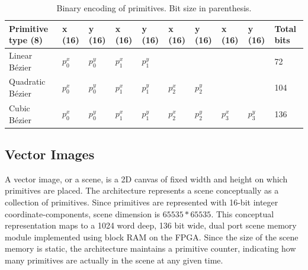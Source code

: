 \begin{table}[h]
    \centering
    \begin{tabular}{|l|l|l|l|l|l|l|l|l|l|}
    \hline
    Primitive type (8) & x (16) & y (16) & x (16) & y (16) & x (16) & y (16) & x (16) & y (16) & Total bits \\ \hline
    Linear Bézier    & \(p_0^x \) & \(p_0^y \) & \(p_1^x \) & \(p_1^y \) & ~   & ~   & ~   & ~   & 72    \\ \hline
    Quadratic Bézier & \(p_0^x \) & \(p_0^y \) & \(p_1^x \) & \(p_1^y \) & \(p_2^x \) & \(p_2^y \) & ~   & ~   & 104   \\ \hline
    Cubic Bézier     & \(p_0^x \) & \(p_0^y \) & \(p_1^x \) & \(p_1^y \) & \(p_2^x \) & \(p_2^y \) & \(p_3^x \) & \(p_3^y \) & 136   \\ \hline
    \end{tabular}
    \caption{Binary encoding of primitives. Bit size in parenthesis.}
	\label{tbl:primitives}
\end{table}

\subsection{Vector Images}

A vector image, or a scene, is a 2D canvas of fixed width and height on which primitives are placed.
The \vthreek architecture represents a scene conceptually as a collection of primitives.
Since primitives are represented with 16-bit integer coordinate-components, scene dimension is $65535 * 65535$.
This conceptual representation maps to a 1024 word deep, 136 bit wide, dual port scene memory module implemented using block RAM \cite{xilinx-block-ram} on the FPGA.
Since the size of the scene memory is static, the architecture maintains a primitive counter, indicating how many primitives are actually in the scene at any given time.
